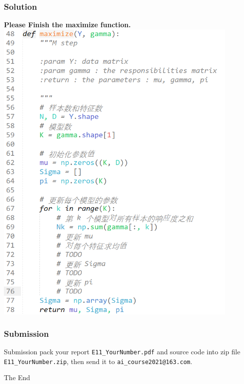 \documentclass{beamer}
\begin{document}
\begin{frame}
  \frametitle{Solution}
	  \textbf{Please Finish the maximize function.}
      \\[10pt]
      \includegraphics[width=0.9\textwidth]{Pic/maximize.png}

\end{frame}


\begin{frame}
  \frametitle{Submission}
  \begin{block}{Submission}
    pack your report \texttt{E11\_YourNumber.pdf} and source code into zip file \texttt{E11\_YourNumber.zip}, then send it to \texttt{ai\_course2021@163.com}.
  \end{block}
\end{frame}


\begin{frame}
  \Huge{\centerline{The End}}
\end{frame}

\end{document}
